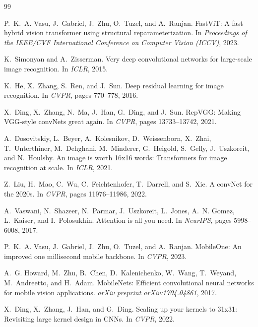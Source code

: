 \documentclass[12pt, a4paper]{report}
\begin{document}

\begin{thebibliography}{99}

P.~K.~A. Vasu, J.~Gabriel, J.~Zhu, O.~Tuzel, and A.~Ranjan.
\newblock Fast{V}i{T}: A fast hybrid vision transformer using structural reparameterization.
\newblock In \emph{Proceedings of the IEEE/CVF International Conference on Computer Vision (ICCV)}, 2023.

K.~Simonyan and A.~Zisserman.
\newblock Very deep convolutional networks for large-scale image recognition.
\newblock In \emph{ICLR}, 2015.

K.~He, X.~Zhang, S.~Ren, and J.~Sun.
\newblock Deep residual learning for image recognition.
\newblock In \emph{CVPR}, pages 770--778, 2016.

X.~Ding, X.~Zhang, N.~Ma, J.~Han, G.~Ding, and J.~Sun.
\newblock Rep{VGG}: Making {VGG}-style conv{N}ets great again.
\newblock In \emph{CVPR}, pages 13733--13742, 2021.

A.~Dosovitskiy, L.~Beyer, A.~Kolesnikov, D.~Weissenborn, X.~Zhai, T.~Unterthiner, M.~Dehghani, M.~Minderer, G.~Heigold, S.~Gelly, J.~Uszkoreit, and N.~Houlsby.
\newblock An image is worth 16x16 words: Transformers for image recognition at scale.
\newblock In \emph{ICLR}, 2021.

Z.~Liu, H.~Mao, C.~Wu, C.~Feichtenhofer, T.~Darrell, and S.~Xie.
\newblock A conv{N}et for the 2020s.
\newblock In \emph{CVPR}, pages 11976--11986, 2022.

A.~Vaswani, N.~Shazeer, N.~Parmar, J.~Uszkoreit, L.~Jones, A.~N. Gomez, L.~Kaiser, and I.~Polosukhin.
\newblock Attention is all you need.
\newblock In \emph{NeurIPS}, pages 5998--6008, 2017.

P.~K.~A. Vasu, J.~Gabriel, J.~Zhu, O.~Tuzel, and A.~Ranjan.
\newblock Mobile{O}ne: An improved one millisecond mobile backbone.
\newblock In \emph{CVPR}, 2023.

A.~G. Howard, M.~Zhu, B.~Chen, D.~Kalenichenko, W.~Wang, T.~Weyand, M.~Andreetto, and H.~Adam.
\newblock Mobile{N}ets: Efficient convolutional neural networks for mobile vision applications.
\newblock \emph{arXiv preprint arXiv:1704.04861}, 2017.

X.~Ding, X.~Zhang, J.~Han, and G.~Ding.
\newblock Scaling up your kernels to 31x31: Revisiting large kernel design in {CNN}s.
\newblock In \emph{CVPR}, 2022.


\end{thebibliography}
\end{document}
